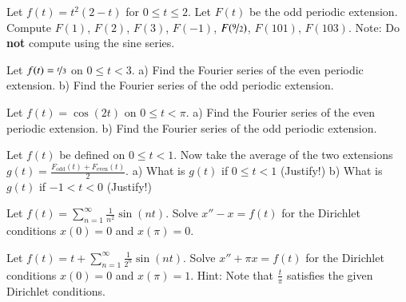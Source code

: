 \begin{exercise}
Let $f(t) = t^2(2-t)$ for $0 \leq t \leq 2$.  Let $F(t)$ be the odd periodic
extension.  Compute $F(1)$, $F(2)$, $F(3)$, $F(-1)$, $F(\nicefrac{9}{2})$,
$F(101)$, $F(103)$.  Note: Do \textbf{not} compute using the sine series.
\end{exercise}

\setcounter{exercise}{100}

\begin{exercise}
Let $f(t) = \nicefrac{t}{3}$ on $0 \leq t < 3$.  a) Find the Fourier series of
the even periodic extension.  b) Find the Fourier series of the odd
periodic extension.
\end{exercise}

\begin{exercise}
Let $f(t) = \cos(2t)$ on $0 \leq t < \pi$.  a) Find the Fourier series of
the even periodic extension.  b) Find the Fourier series of the odd
periodic extension.
\end{exercise}

\begin{exercise}
Let $f(t)$ be defined on $0 \leq t < 1$.  Now take
the average of the two extensions
$g(t) = \frac{F_{\text{odd}}(t)+ F_{\text{even}}(t)}{2}$.
a) What is $g(t)$ if $0 \leq t < 1$ (Justify!)
b) What is $g(t)$ if $-1 < t < 0$ (Justify!)
\end{exercise}

\begin{exercise}
Let $f(t) = \sum_{n=1}^\infty \frac{1}{n^2} \sin(nt)$.  Solve
$x''- x = f(t)$ for the Dirichlet conditions $x(0) = 0$
and $x(\pi) = 0$.
\end{exercise}

\begin{exercise}[challenging]
Let $f(t) = t + \sum_{n=1}^\infty \frac{1}{2^n} \sin(nt)$.  Solve
$x'' + \pi x = f(t)$ for the Dirichlet conditions $x(0) = 0$
and $x(\pi) = 1$.  Hint:  Note that $\frac{t}{\pi}$ satisfies the
given Dirichlet conditions.
\end{exercise}



